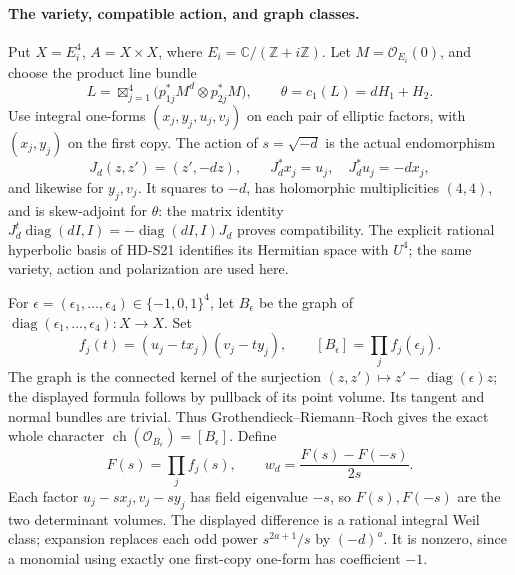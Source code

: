 \paragraph{The variety, compatible action, and graph classes.}
Put \(X=E_i^4\), \(A=X\times X\), where
\(E_i=\mathbb C/(\mathbb Z+i\mathbb Z)\). Let \(M=\mathcal O_{E_i}(0)\),
and choose the product line bundle
\[
 L=\boxtimes_{j=1}^4\bigl(p_{1j}^*M^d\otimes p_{2j}^*M\bigr),
 \qquad \theta=c_1(L)=dH_1+H_2.
\]
Use integral one-forms \((x_j,y_j,u_j,v_j)\) on each pair of elliptic
factors, with \((x_j,y_j)\) on the first copy. The action of
\(s=\sqrt{-d}\) is the actual endomorphism
\[
 J_d(z,z')=(z',-dz),\qquad
 J_d^*x_j=u_j,\quad J_d^*u_j=-dx_j,
\]
and likewise for \(y_j,v_j\). It squares to \(-d\), has
holomorphic multiplicities \((4,4)\), and is skew-adjoint for
\(\theta\): the matrix identity
\(J_d^t\operatorname{diag}(dI,I)
=-\operatorname{diag}(dI,I)J_d\) proves compatibility. The
explicit rational hyperbolic basis of HD-S21 identifies its Hermitian
space with \(U^4\); the same variety, action and polarization are
used here.

For \(\epsilon=(\epsilon_1,\ldots,\epsilon_4)\in\{-1,0,1\}^4\),
let \(B_\epsilon\) be the graph of
\(\operatorname{diag}(\epsilon_1,\ldots,\epsilon_4):X\to X\).
Set
\[
 f_j(t)=(u_j-tx_j)(v_j-ty_j),\qquad
 [B_\epsilon]=\prod_j f_j(\epsilon_j).
\]
The graph is the connected kernel of the surjection
\((z,z')\mapsto z'-\operatorname{diag}(\epsilon)z\); the displayed
formula follows by pullback of its point volume. Its tangent and
normal bundles are trivial. Thus Grothendieck--Riemann--Roch gives
the exact whole character \(\operatorname{ch}(\mathcal O_{B_\epsilon})
=[B_\epsilon]\). Define
\[
 F(s)=\prod_j f_j(s),\qquad
 w_d=\frac{F(s)-F(-s)}{2s}.
\]
Each factor \(u_j-sx_j,v_j-sy_j\) has field eigenvalue \(-s\),
so \(F(s),F(-s)\) are the two determinant volumes. The displayed
difference is a rational integral Weil class; expansion replaces
each odd power \(s^{2a+1}/s\) by \((-d)^a\). It is nonzero,
since a monomial using exactly one first-copy one-form has
coefficient \(-1\).

